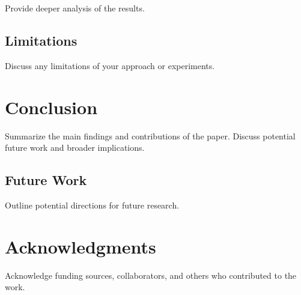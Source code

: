 \documentclass[11pt,a4paper]{article}
\theoremstyle{definition}
\theoremstyle{remark}
\begin{document}
Provide deeper analysis of the results.

\subsection{Limitations}

Discuss any limitations of your approach or experiments.

\section{Conclusion}
\label{sec:conclusion}

Summarize the main findings and contributions of the paper. Discuss potential future work and broader implications.

\subsection{Future Work}

Outline potential directions for future research.

\section*{Acknowledgments}

Acknowledge funding sources, collaborators, and others who contributed to the work.




\end{document}
